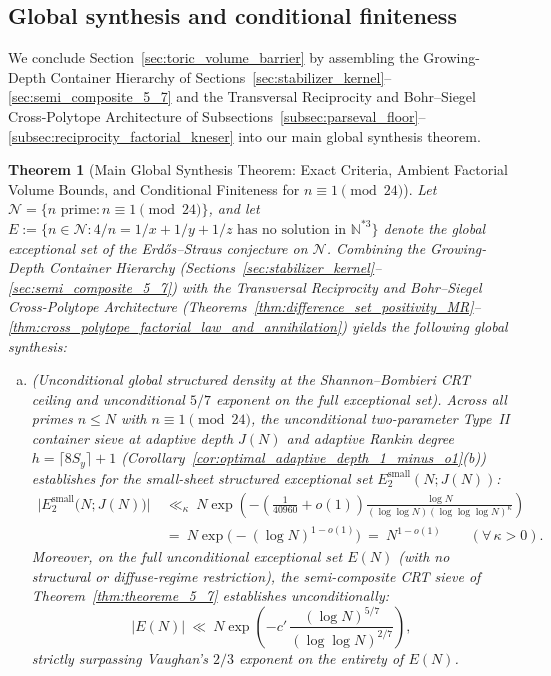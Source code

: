 \documentclass[11pt, a4paper]{article}
\theoremstyle{plain}
\newtheorem{theorem}{Theorem}[section]
\theoremstyle{definition}
\newcommand{\N}{\mathbb{N}}
\begin{document}
\subsection{Global synthesis and conditional finiteness}\label{subsec:global_synthesis}

We conclude Section~\ref{sec:toric_volume_barrier} by assembling the Growing-Depth Container Hierarchy of Sections~\ref{sec:stabilizer_kernel}--\ref{sec:semi_composite_5_7} and the Transversal Reciprocity and Bohr--Siegel Cross-Polytope Architecture of Subsections~\ref{subsec:parseval_floor}--\ref{subsec:reciprocity_factorial_kneser} into our main global synthesis theorem.

\begin{theorem}[Main Global Synthesis Theorem: Exact Criteria, Ambient Factorial Volume Bounds, and Conditional Finiteness for $n\equiv1\pmod{24}$]\label{thm:main_global_synthesis}
Let $\mathcal{N}=\{n\text{ prime}:n\equiv1\pmod{24}\}$, and let $E:=\{n\in\mathcal{N}:4/n=1/x+1/y+1/z\text{ has no solution in }\N^{\ast 3}\}$ denote the global exceptional set of the Erd\H{o}s--Straus conjecture on $\mathcal{N}$. Combining the Growing-Depth Container Hierarchy (Sections~\ref{sec:stabilizer_kernel}--\ref{sec:semi_composite_5_7}) with the Transversal Reciprocity and Bohr--Siegel Cross-Polytope Architecture (Theorems~\ref{thm:difference_set_positivity_MR}--\ref{thm:cross_polytope_factorial_law_and_annihilation}) yields the following global synthesis:
\begin{enumerate}[(a)]
    \item \emph{(Unconditional global structured density at the Shannon--Bombieri CRT ceiling and unconditional $5/7$ exponent on the full exceptional set).} Across all primes $n\le N$ with $n\equiv1\pmod{24}$, the unconditional two-parameter Type~II container sieve at adaptive depth $J(N)$ and adaptive Rankin degree $h=\lceil 8S_y\rceil+1$ (Corollary~\ref{cor:optimal_adaptive_depth_1_minus_o1}(b)) establishes for the small-sheet structured exceptional set $E_2^{\mathrm{small}}(N;J(N))$:
    \begin{equation}\label{eq:main_synthesis_global_density}
    \begin{split}
    \big|E_2^{\mathrm{small}}\big(N;J(N)\big)\big|\ &\ll_\kappa\ N\exp\!\left(-\left(\frac{1}{40960}+o(1)\right)\frac{\log N}{(\log\log N)(\log\log\log N)^{\kappa}}\right)\\
    &=\ N\exp\!\big(-(\log N)^{1-o(1)}\big)\ =\ N^{1-o(1)}\qquad(\forall\,\kappa>0).
    \end{split}
    \end{equation}
    Moreover, on the \emph{full} unconditional exceptional set $E(N)$ (with no structural or diffuse-regime restriction), the semi-composite CRT sieve of Theorem~\ref{thm:theoreme_5_7} establishes unconditionally:
    \begin{equation}\label{eq:main_synthesis_full_5_7}
    |E(N)|\ \ll\ N\exp\!\left(-c'\,\frac{(\log N)^{5/7}}{(\log\log N)^{2/7}}\right),
    \end{equation}
    strictly surpassing Vaughan's $2/3$ exponent on the entirety of $E(N)$.


\end{enumerate}
\end{theorem}
\end{document}
